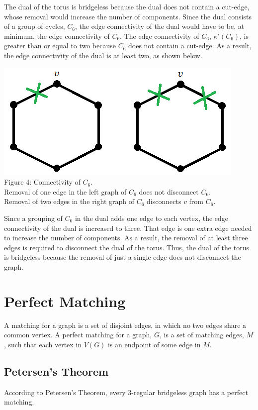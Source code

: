 \documentclass[12pt]{article}
\begin{document}
\begin{flushleft}
\medskip
The dual of the torus is bridgeless because the dual does not contain a cut-edge, whose removal would increase the number of components. Since the dual consists of a group of cycles, $C_6$, the edge connectivity of the dual would have to be, at minimum, the edge connectivity of $C_6$. The edge connectivity of $C_6$, $\kappa'(C_6)$, is greater than or equal to two because $C_6$ does not contain a cut-edge. As a result, the edge connectivity of the dual is at least two, as shown below.

\begin{center}
\includegraphics[scale=1]{images/c6connectivity.png}\\
Figure 4: Connectivity of $C_6$.\\
Removal of one edge in the left graph of $C_6$ does not disconnect $C_6$.\\
Removal of two edges in the right graph of $C_6$ disconnects $v$ from $C_6$.
\end{center}

\medskip
Since a grouping of $C_6$ in the dual adds one edge to each vertex, the edge connectivity of the dual is increased to three. That edge is one extra edge needed to increase the number of components. As a result, the removal of at least three edges is required to disconnect the dual of the torus. Thus, the dual of the torus is bridgeless because the removal of just a single edge does not disconnect the graph.

\section*{Perfect Matching}
A matching for a graph is a set of disjoint edges, in which no two edges share a common vertex. A perfect matching for a graph, $G$, is a set of matching edges, $M$, such that each vertex in $V(G)$ is an endpoint of some edge in $M$.

\subsection*{Petersen's Theorem}
\medskip
According to Petersen's Theorem, every 3-regular bridgeless graph has a perfect matching.


\end{flushleft}
\end{document}
